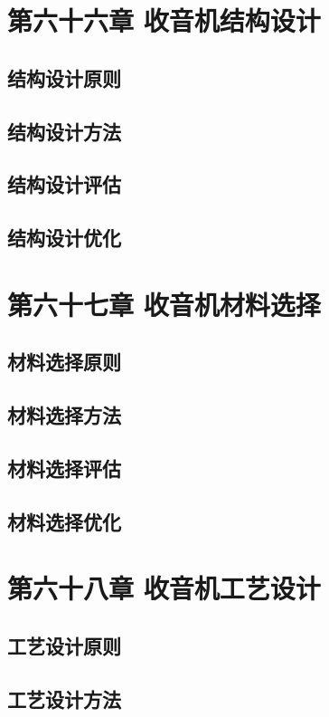 \documentclass[12pt,UTF8]{ctexbook}
\begin{document}
\chapter{第六十六章 收音机结构设计}

\section{结构设计原则}
\section{结构设计方法}
\section{结构设计评估}
\section{结构设计优化}

\chapter{第六十七章 收音机材料选择}

\section{材料选择原则}
\section{材料选择方法}
\section{材料选择评估}
\section{材料选择优化}

\chapter{第六十八章 收音机工艺设计}

\section{工艺设计原则}
\section{工艺设计方法}
\end{document}
